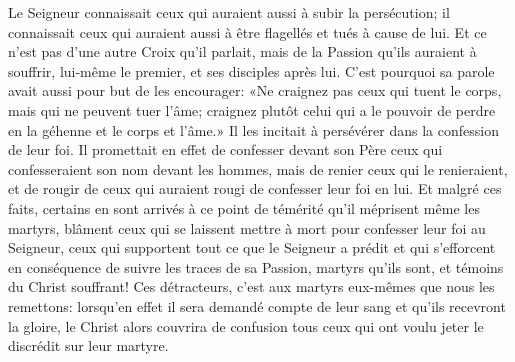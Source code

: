Le Seigneur connaissait ceux qui auraient aussi à subir la persécution;
	il connaissait ceux qui auraient aussi à être flagellés et tués à cause de lui.
Et ce n'est pas d'une autre Croix qu'il parlait,
	mais de la Passion qu'ils auraient à souffrir,
	lui-même le premier, et ses disciples après lui.
C'est pourquoi sa parole avait aussi pour but de les encourager:
	«Ne craignez pas ceux qui tuent le corps, mais qui ne peuvent tuer l'âme;
	craignez plutôt celui qui a le pouvoir de perdre en la géhenne et le corps et l'âme.»
Il les incitait à persévérer dans la confession de leur foi.
Il promettait en effet
	de confesser devant son Père ceux qui confesseraient son nom devant les hommes,
	mais de renier ceux qui le renieraient,
	et de rougir de ceux qui auraient rougi de confesser leur foi en lui.
Et malgré ces faits, certains en sont arrivés à ce point de témérité
	qu'il méprisent même les martyrs,
	blâment ceux qui se laissent mettre à mort pour confesser leur foi au Seigneur,
	ceux qui supportent tout ce que le Seigneur a prédit
	et qui s'efforcent en conséquence de suivre les traces de sa Passion,
	martyrs qu'ils sont, et témoins du Christ souffrant!
Ces détracteurs, c'est aux martyrs eux-mêmes que nous les remettons:
	lorsqu'en effet il sera demandé compte de leur sang et qu'ils recevront la gloire,
	le Christ alors couvrira de confusion
		tous ceux qui ont voulu jeter le discrédit sur leur martyre.
